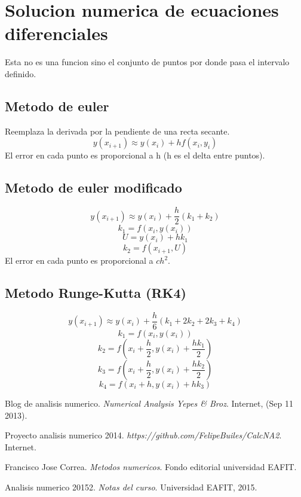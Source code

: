 \documentclass[11pt]{article}
\begin{document}
\section{Solucion numerica de ecuaciones diferenciales}
Esta no es una funcion sino el conjunto de puntos por donde pasa el intervalo definido.
\subsection{Metodo de euler}
Reemplaza la derivada por la pendiente de una recta secante.
\[ y(x_{i+1}) \approx y(x_{i}) + hf(x_{i},y_{i})\]
El error en cada punto es proporcional a h (h es el delta entre puntos).
\subsection{Metodo de euler modificado}
\[ y(x_{i+1}) \approx y(x_{i}) + \dfrac{h}{2} (k_{1}+k_{2})\]
\[ k_{1} = f(x_{i},y(x_{i})) \]
\[ U = y(x_{i}) + hk_{1}\]
\[ k_{2} = f(x_{i+1}, U)\]
El error en cada punto es proporcional a $ch^{2}$.

\subsection{Metodo Runge-Kutta (RK4)}
\[ y(x_{i+1}) \approx y(x_{i}) + \dfrac{h}{6} (k_{1}+2k_{2}+2k_{3}+k_{4})\]
\[ k_{1} = f(x_{i},y(x_{i})) \]
\[ k_{2} = f(x_{i}+\dfrac{h}{2},y(x_{i}) + \dfrac{hk_{1}}{2}) \]
\[ k_{3} = f(x_{i}+\dfrac{h}{2},y(x_{i}) + \dfrac{hk_{2}}{2}) \]
\[ k_{4} = f(x_{i}+h,y(x_{i}) + hk_{3}) \]

\begin{thebibliography}{9}
  Blog de analisis numerico.
  \textit{Numerical Analysis Yepes \& Broz}.
  Internet, (Sep 11 2013).

  Proyecto analisis numerico 2014.
  \textit{https://github.com/FelipeBuiles/CalcNA2}.
  Internet.

  Francisco Jose Correa.
  \textit{Metodos numericos}.
  Fondo editorial universidad EAFIT.

  Analisis numerico 20152.
  \textit{Notas del curso}.
  Universidad EAFIT, 2015.
  
\end{thebibliography}
\end{document}
